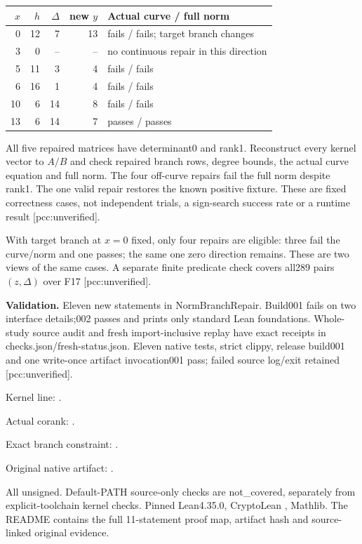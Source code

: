 \documentclass[11pt]{article}
\begin{document}
\begin{center}\small
\begin{tabular}{rrrrl}
$x$ & $h$ & $\Delta$ & new $y$ & Actual curve / full norm\\\hline
0&12&7&13&fails / fails; target branch changes\\
3&0&--&--&no continuous repair in this direction\\
5&11&3&4&fails / fails\\
6&16&1&4&fails / fails\\
10&6&14&8&fails / fails\\
13&6&14&7&passes / passes
\end{tabular}
\end{center}
All five repaired matrices have determinant0 and rank1. Reconstruct every
kernel vector to $A/B$ and check repaired branch rows, degree bounds,
the actual curve equation and full norm.
The four off-curve repairs fail the full norm despite rank1. The one valid
repair restores the known positive fixture. These are fixed correctness cases,
not independent trials, a sign-search success rate or a runtime result
[pcc:unverified].

With target branch at $x=0$ fixed, only four repairs are eligible: three
fail the curve/norm and one passes; the same one zero direction remains.
These are two views of the same cases. A separate finite predicate check
covers all289 pairs $(z,\Delta)$ over F17 [pcc:unverified].

\textbf{Validation.} Eleven new statements in NormBranchRepair. Build001
fails on two interface details;002 passes and prints only standard Lean
foundations. Whole-study source audit and fresh import-inclusive replay have
exact receipts in checks.json/fresh-status.json. Eleven native tests,
strict clippy, release build001 and one write-once artifact invocation001
pass; failed source log/exit retained [pcc:unverified].

Kernel line: .\par
Actual corank: .\par
Exact branch constraint: .\par
Original native artifact: .\par
All unsigned. Default-PATH source-only checks are not\_covered, separately
from explicit-toolchain kernel checks. Pinned Lean4.35.0, CryptoLean
, Mathlib. The README contains the full
11-statement proof map, artifact hash and source-linked original evidence.
\end{document}
